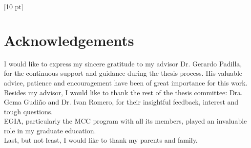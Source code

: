 \titleformat{\chapter}{\Huge\bfseries}{\thechapter}{0 pt}{\rule{340 pt}{3 pt}\\}
\titlespacing{\chapter}{100 pt}{-25 pt}{40 pt}[10 pt]	
\pagestyle{fancy}
\fancyhead[RO,RE]{\thepage}
\fancyfoot[CO,CE]{}

\chapter*{Acknowledgements}

\normalsize
\noindent I would like to express my sincere gratitude to my advisor Dr. Gerardo Padilla, for the continuous support and guidance during the thesis process. His valuable advice, patience and encouragement have been of great
importance for this work. \\

Besides my advisor, I would like to thank the rest of the thesis committee: Dra. Gema Gudi\~no and Dr. Ivan Romero, for their insightful feedback, interest and tough questions. \\

EGIA, particularly the MCC program with all its members, played an invaluable role in my graduate education. \\

Last, but not least, I would like to thank my parents and family.
\clearpage